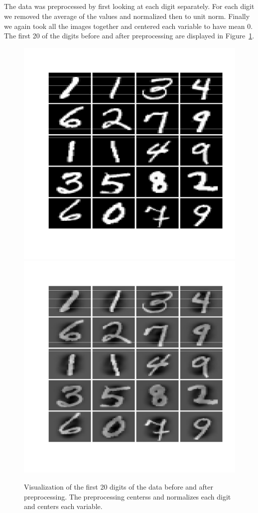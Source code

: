 \documentclass{article}
\begin{document}
\subsection{}\label{sec:31}
The data was preprocessed by first looking at each digit separately.
For each digit we removed the average of the values and normalized then to unit norm.
Finally we again took all the images together and centered each variable to have mean 0.
The first 20 of the digits before and after preprocessing are displayed in Figure~\ref{fig:digits}.
\begin{figure}\centering
	\includegraphics[scale=0.4]{digits}
	\includegraphics[scale=0.4]{digitspre}
	\caption{Visualization of the first 20 digits of the data before and after preprocessing.
	The preprocessing centerss and normalizes each digit and centers each variable.}\label{fig:digits}
\end{figure}
\end{document}
